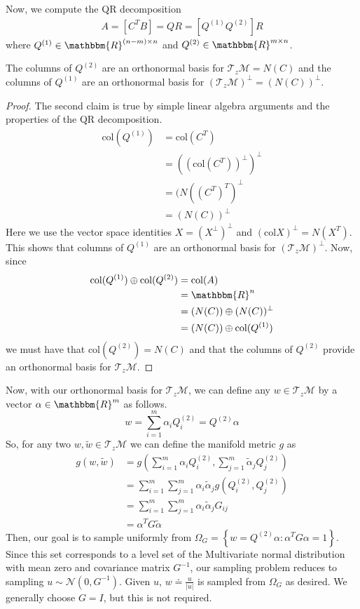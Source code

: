 Now, we compute the QR decomposition 
\begin{align}
        A = \left[C^T B\right] = QR = \left[Q^{(1)} Q^{(2)}\right] R
\end{align}
where $Q^{(1)} \in \mathbbm{R}^{(n-m)\times n}$ and $ Q^{(2)} \in \mathbbm{R}^{m\times n}$.
\begin{mythm}
\label{thm:Qbases}
The columns of $Q^{(2)}$ are an orthonormal basis for $\mathcal{T}_z\mathcal{M} = N(C)$ and the columns of $Q^{(1)}$ are an orthonormal basis for $(\mathcal{T}_z\mathcal{M})^\perp = (N(C))^\perp$.
\end{mythm}
\begin{proof}
The second claim is true by simple linear algebra arguments and the properties of the QR decomposition.
\begin{align}
        \text{col} (Q^{(1)}) &= \text{col}(C^T)\\
        &= ((\text{col}(C^T))^\perp)^\perp\\
        &= (N((C^T)^T)^\perp \\ 
        &= (N(C))^\perp
\end{align}
Here we use the vector space identities $X = (X^\perp)^\perp$ and $(\text{col} X)^\perp = N(X^T)$. This shows that columns of $Q^{(1)}$ are an orthonormal basis for $(\mathcal{T}_z\mathcal{M})^\perp$. Now, since 
\begin{align}
        \text{col} (Q^{(1)}) \oplus \text{col} (Q^{(2)}) &= \text{col}(A) \\
        &= \mathbbm{R}^n \\
        & = (N(C)) \oplus (N(C))^\perp \\
        & = (N(C)) \oplus \text{col} (Q^{(1)})
\end{align}
 we must have that $\text{col}(Q^{(2)}) = N(C)$ and that the columns of $Q^{(2)}$ provide an orthonormal basis for $\mathcal{T}_z\mathcal{M}$.
\end{proof}
Now, with our orthonormal basis for $\mathcal{T}_z\mathcal{M}$, we can define any $w \in \mathcal{T}_z\mathcal{M}$ by a vector $\alpha \in\mathbbm{R}^m$ as follows.
$$w = \sum_{i=1}^m \alpha_iQ^{(2)}_i = Q^{(2)}\alpha$$
So, for any two $w,\tilde{w} \in \mathcal{T}_z\mathcal{M}$ we can define the manifold metric $g$ as
\begin{align}
        g(w,\tilde{w}) &= g\left(\sum_{i=1}^m \alpha_iQ^{(2)}_i, \sum_{j=1}^m \tilde{\alpha}_jQ^{(2)}_j\right) \\
        &= \sum_{i=1}^m\sum_{j=1}^m  \alpha_i \tilde{\alpha}_j g\left(Q^{(2)}_i, Q^{(2)}_j\right) \\
        &= \sum_{i=1}^m\sum_{j=1}^m  \alpha_i \tilde{\alpha}_j G_{ij} \\
        &= \alpha^T  G\tilde{\alpha}
\end{align}
Then, our goal is to sample uniformly from $\Omega_G = \left\{w = Q^{(2)}\alpha : \alpha^T G\alpha = 1\right\}$. Since this set corresponds to a level set of the Multivariate normal distribution with mean zero and covariance matrix $G^{-1}$, our sampling problem reduces to sampling $u \sim \mathcal{N}(0,G^{-1})$. Given $u$, $w \doteq \frac{u}{|u|}$ is sampled from $\Omega_G$ as desired. We generally choose $G = I$, but this is not required. 

